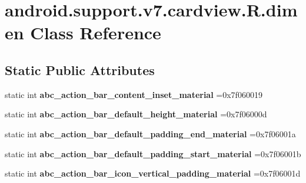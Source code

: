 \hypertarget{classandroid_1_1support_1_1v7_1_1cardview_1_1R_1_1dimen}{}\section{android.\+support.\+v7.\+cardview.\+R.\+dimen Class Reference}
\label{classandroid_1_1support_1_1v7_1_1cardview_1_1R_1_1dimen}
\subsection*{Static Public Attributes}
\begin{DoxyCompactItemize}
\item 
\mbox{\label{classandroid_1_1support_1_1v7_1_1cardview_1_1R_1_1dimen_aaf0056e12cb13500a9216df1bcc84962}} 
static int {\bfseries abc\+\_\+action\+\_\+bar\+\_\+content\+\_\+inset\+\_\+material} =0x7f060019
\item 
\mbox{\label{classandroid_1_1support_1_1v7_1_1cardview_1_1R_1_1dimen_a571092a5227ff42fec5aac70f4a8bf5e}} 
static int {\bfseries abc\+\_\+action\+\_\+bar\+\_\+default\+\_\+height\+\_\+material} =0x7f06000d
\item 
\mbox{\label{classandroid_1_1support_1_1v7_1_1cardview_1_1R_1_1dimen_a94a059c23b903e5d0499930716a74b4c}} 
static int {\bfseries abc\+\_\+action\+\_\+bar\+\_\+default\+\_\+padding\+\_\+end\+\_\+material} =0x7f06001a
\item 
\mbox{\label{classandroid_1_1support_1_1v7_1_1cardview_1_1R_1_1dimen_a40234a0550da919e9b61121624fdd629}} 
static int {\bfseries abc\+\_\+action\+\_\+bar\+\_\+default\+\_\+padding\+\_\+start\+\_\+material} =0x7f06001b
\item 
\mbox{\label{classandroid_1_1support_1_1v7_1_1cardview_1_1R_1_1dimen_a34660b1ce02f0b8427fbe8be0a1ad6a4}} 
static int {\bfseries abc\+\_\+action\+\_\+bar\+\_\+icon\+\_\+vertical\+\_\+padding\+\_\+material} =0x7f06001d
\item 
\mbox{\label{classandroid_1_1support_1_1v7_1_1cardview_1_1R_1_1dimen_aef3a576903d9947799e075775e08ccf4}} 

\end{DoxyCompactItemize}
